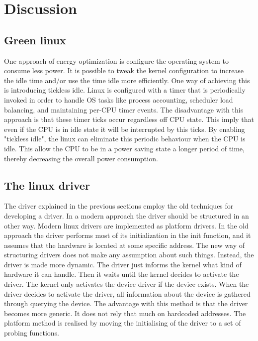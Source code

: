 \section{Discussion}

\subsection{Green linux}
One approach of energy optimization is configure the operating system to consume less power. It is possible to tweak the kernel configuration to increase the idle time and/or use the time idle more efficiently. One way of achieving this is introducing tickless idle. Linux is configured with a timer that is periodically invoked in order to handle OS tasks like process accounting, scheduler load balancing, and maintaining per-CPU timer events. The disadvantage with this approach is that these timer ticks occur regardless off CPU state. This imply that even if the CPU is in idle state it will be interrupted by this ticks. By enabling "tickless idle", the linux can eliminate this periodic behaviour when the CPU is idle. This allow the CPU to be in a power saving state a longer period of time, thereby decreasing the overall power consumption\cite{tick}.



\subsection{The linux driver}
The driver explained in the previous sections employ the old techniques for developing a driver. In a modern approach the driver should be structured in an other way. Modern linux drivers are implemented as platform drivers. In the old approach the driver performs most of its initialization in the init function, and it assumes that the hardware is located at some specific address. The new way of structuring drivers does not make any assumption about such things. Instead, the driver is made more dynamic. The driver just informs the kernel what kind of hardware it can handle. Then it waits until the kernel decides to activate the driver. The kernel only activates the device driver if the device exists. When the driver decides to activate the driver, all information about the device is gathered through querying the device. The advantage with this method is that the driver becomes more generic. It does not rely that much on hardcoded addresses. The platform method is realised by moving the initialising  of the driver to a set of probing functions. 

